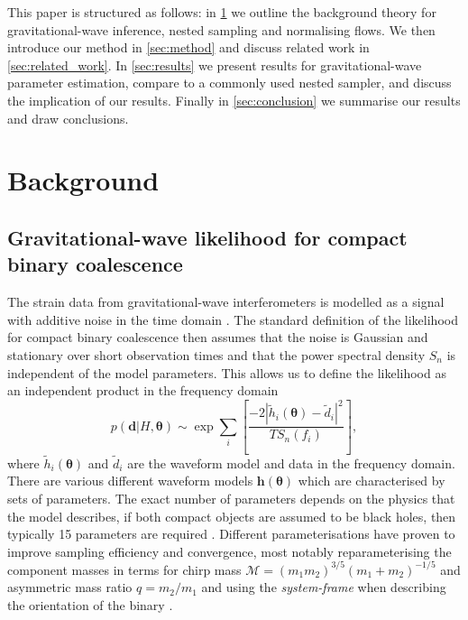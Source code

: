 \documentclass[%
 reprint,
nofootinbib,
 amsmath,amssymb,
 aps,
 prd,
]{revtex4-2}
\renewcommand{\vec}[1]{\boldsymbol{#1}}
\begin{document}
This paper is structured as follows: in \cref{sec:background} we outline the background theory for gravitational-wave inference, nested sampling and normalising flows. We then introduce our method in \cref{sec:method} and discuss related work in \cref{sec:related_work}. In \cref{sec:results} we present results for gravitational-wave parameter estimation, compare to a commonly used nested sampler, and discuss the implication of our results. Finally in \cref{sec:conclusion} we summarise our results and draw conclusions.

\section{Background}\label{sec:background}

\subsection{Gravitational-wave likelihood for compact binary coalescence}\label{sec:gw_likelihood}


The strain data from gravitational-wave interferometers is modelled as a signal with additive noise in the time domain \cite{Veitch:2015}. The standard definition of the likelihood for compact binary coalescence then assumes that the noise is Gaussian and stationary over short observation times and that the power spectral density $S_n$ is independent of the model parameters. This allows us to define the likelihood as an independent product in the frequency domain
%
\begin{equation}\label{eq:gw_likelihood}
    p(\vec{d}|H, \vec{\theta}) \sim \exp \sum_{i} \left[ \frac{-2|\tilde{h}_{i}(\vec{\theta}) - \tilde{d}_{i}|^{2}}{TS_{n}(f_{i})} \right],
\end{equation}
%
where $\tilde{h}_{i}(\vec{\theta})$ and $\tilde{d}_{i}$ are the waveform model and data in the frequency domain. There are various different waveform models $\vec{h}(\vec{\theta})$ which are characterised by sets of parameters. The exact number of parameters depends on the physics that the model describes, if both compact objects are assumed to be black holes, then typically 15 parameters are required \cite{Veitch:2015}. Different parameterisations have proven to improve sampling efficiency and convergence, most notably reparameterising the component masses in terms for chirp mass $\mathcal{M} = (m_1 m_2)^{3/5} (m_1 + m_2 )^{-1/5}$ and asymmetric mass ratio $q = m_{2} / m_{1}$ \cite{Veitch:2015} and using the \textit{system-frame} when describing the orientation of the binary \cite{Farr:2014system-frame}.
\end{document}
